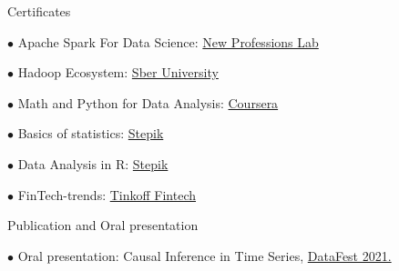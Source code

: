 \documentclass{resume} %
\begin{document}
\begin{rSection}{ Certificates }
    
    \noindent
    \begin{multicols}{2}[]
    
    $\bullet$ Apache Spark For Data Science: \href{https://drive.google.com/file/d/1evNnhppurXyzoJdDQp115oRHAtRayW5c/view?usp=sharing}{New Professions Lab} 
    
    $\bullet$ Hadoop Ecosystem: \href{https://drive.google.com/file/d/1oKQetSzr_RCyxpTdWmbY30uNEQGlxMRn/view?usp=sharing}{Sber University}
    
    $\bullet$ Math and Python for Data Analysis: \href{https://coursera.org/share/bbccb26f066e4ed7ca05c52754b15976}{Coursera} 
    
    $\bullet$ Basics of statistics: \href{https://stepik.org/cert/258802}{Stepik}

    $\bullet$ Data Analysis in R: \href{https://stepik.org/cert/744648}{Stepik}
    
    $\bullet$ FinTech-trends: \href{https://drive.google.com/file/d/1kws8qPbbTlbQyyTZY5I2eY6o37Grdccv/view?usp=sharing}{Tinkoff Fintech}
    
    \end{multicols}

\end{rSection}

\begin{rSection}{ Publication and Oral presentation }

    { $\bullet$ Oral presentation: Causal Inference in Time Series, \href{https://youtu.be/Yr6b8Rpy7Ds}{DataFest 2021. }}\\
    
\end{rSection}
\end{document}
